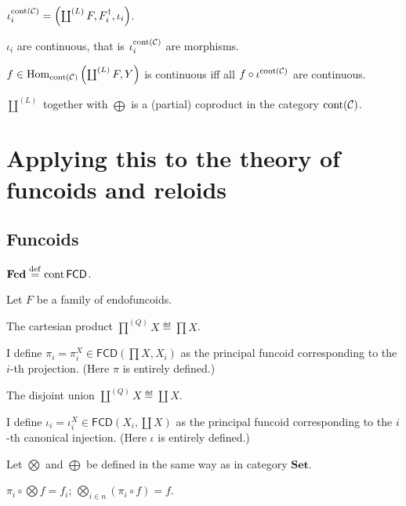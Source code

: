 \begin{defn}
  $\iota^{\operatorname{cont} (\mathcal{C})}_i = \left( \coprod^{(L)} F ,
  F_i^{\dagger} , \iota_i \right)$.
\end{defn}

\begin{prop}
  $\iota_i$ are continuous, that is $\iota^{\operatorname{cont}
  (\mathcal{C})}_i$ are morphisms.
\end{prop}

\begin{lem}
  $f \in \operatorname{Hom}_{\operatorname{cont} (\mathcal{C})} \left(
  \coprod^{(L)} F , Y \right)$  is continuous iff all $f \circ
  \iota^{\operatorname{cont} (\mathcal{C})}$ are continuous.
\end{lem}

\begin{thm}
  $\coprod^{(L)}$ together with $\bigoplus$ is a (partial) coproduct in the
  category $\operatorname{cont} (\mathcal{C})$.
\end{thm}

\section{Applying this to the theory of funcoids and reloids}

\subsection{Funcoids}

\begin{defn}
  $\mathbf{Fcd} \overset{\mathrm{def}}{=} \operatorname{cont} \mathsf{FCD}$.
\end{defn}

Let $F$ be a family of endofuncoids.

The cartesian product $\prod^{(Q)} X \eqdef \prod X$.

I define $\pi_i = \pi^X_i \in \mathsf{FCD} \left( \prod X , X_i
\right)$ as the principal funcoid corresponding to the $i$-th projection.
(Here $\pi$ is entirely defined.)

The disjoint union $\coprod^{(Q)} X \eqdef \coprod X$.

I define $\iota_i = \iota^X_i \in \mathsf{FCD} \left( X_i , \coprod X
\right)$ as the principal funcoid corresponding to the $i$-th canonical
injection. (Here $\iota$ is entirely defined.)

Let $\bigotimes$ and $\bigoplus$ be defined in the same way as in category
$\mathbf{Set}$.

\begin{obvious}
$\pi_i \circ \bigotimes f = f_i$; $\bigotimes_{i \in n} (\pi_i \circ f) =
f$.
\end{obvious}

